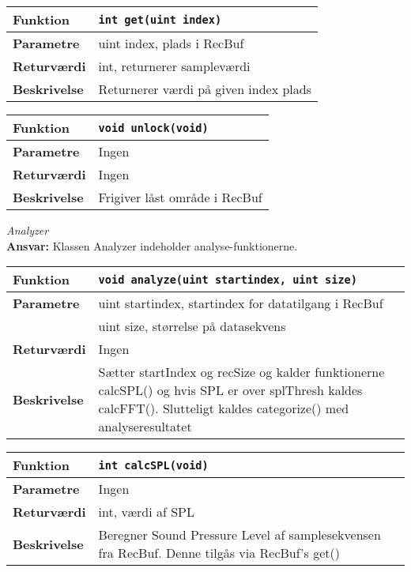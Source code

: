 \begin{center}
    \begin{tabular}{ | l | p{} |}
    \hline
    \textbf{Funktion}	& \verb+int get(uint index) +						\\ \hline
    \textbf{Parametre} 	& uint index, plads i RecBuf	\\ \hline
    \textbf{Returværdi}	& int, returnerer sampleværdi								\\ \hline
    \textbf{Beskrivelse}& Returnerer værdi på given index plads	\\ \hline
    \end{tabular}
\end{center} 

\begin{center}
    \begin{tabular}{ | l | p{} |}
    \hline
    \textbf{Funktion}	& \verb+void unlock(void) +						\\ \hline
    \textbf{Parametre} 	& Ingen		\\ \hline
    \textbf{Returværdi}	& Ingen 								\\ \hline
    \textbf{Beskrivelse}& Frigiver låst område i RecBuf 		\\ \hline
    \end{tabular}
\end{center} 


\textit{Analyzer} \\
\textbf{Ansvar:} Klassen Analyzer indeholder analyse-funktionerne.

\begin{center}
    \begin{tabular}{ | l | p{} |}
    \hline
    \textbf{Funktion}	& \verb+void analyze(uint startindex, uint size) +			\\ \hline
    \textbf{Parametre} 	& uint startindex, startindex for datatilgang i RecBuf		\\ 
    					& uint size, størrelse på datasekvens						\\ \hline
    \textbf{Returværdi}	& Ingen 													\\ \hline
    \textbf{Beskrivelse}& Sætter startIndex og recSize og kalder funktionerne calcSPL() og hvis SPL er over splThresh kaldes calcFFT(). Slutteligt kaldes categorize() med analyseresultatet	\\ \hline
    \end{tabular}
\end{center} 

\begin{center}
    \begin{tabular}{ | l | p{} |}
    \hline
    \textbf{Funktion}	& \verb+int calcSPL(void) +						\\ \hline
    \textbf{Parametre} 	& Ingen		\\ \hline
    \textbf{Returværdi}	& int, værdi af SPL 								\\ \hline
    \textbf{Beskrivelse}& Beregner Sound Pressure Level af samplesekvensen fra RecBuf. Denne tilgås via RecBuf's get()		\\ \hline
    \end{tabular}
\end{center} 

